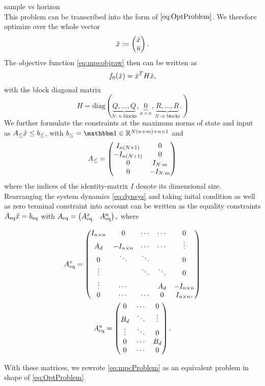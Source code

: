 \todo sample vs horizon\\

This problem can be transcribed into the form of $ \eqref{eq:OptProblem} $. We therefore optimize over the whole vector \[ \tilde{x} := \begin{pmatrix} {\bar{x}} \\ {\bar{u}} \end{pmatrix}. \] The objective function \eqref{eq:mpcobjraw} then can  be written as
\[ f_0(\tilde{x}) = \tilde{x} ^T  H \tilde{x}, \] with  the block diagonal matrix \[ H = \mathrm{diag}(\underbrace{Q,\dots,Q}_{N\cdot n \text{ blocks}},\underbrace{0}_{n \times n},\underbrace{R,\dots,R}_{N \cdot n \text{ blocks}}.) \]
We further formulate the constraints at the maximum norms of state and input as $ {A}_{\mathrm{\leq}} \tilde{x} \leq {b}_{\mathrm{\leq}} $, with $ \bineq = \ones \in \R^{N(n+m)+n \times 1} $ and
\[ {A}_{\mathrm{\leq}} = \begin{pmatrix}
I_{n(N+1)} & 0\\
-I_{n(N+1)} & 0\\
0 & I_{N\cdot m}\\
0 & -I_{N\cdot m}
\end{pmatrix}\]
where the indices of the identity-matrix $ I $ denote its dimensional size.
Rearranging the system dynamics \eqref{eq:dynsys} and taking inital condition as well as zero terminal constraint into account can be written as the equality constraints $ {A}_{\mathrm{eq}} \tilde{x} = {b}_{\mathrm{eq}} $ with
$ {A}_{\mathrm{eq}} =   \left( {A}_{\mathrm{eq}}^x \quad {A}_{\mathrm{eq}}^u \right), $ where

\begin{gather*}
	{A}_{\mathrm{eq}}^x =  \begin{pmatrix}
	I_{n\times n} & 0 & \cdots & \cdots & 0\\
	A_d & -I_{n\times n} & \cdots & \cdots & \vdots\\
	0 & \ddots & \ddots &  &  0\\
	\vdots & & \ddots  & \ddots & 0\\
	\vdots & \cdots & & A_d & -I_{n\times n}\\
	0 &\cdots& \cdots & 0& I_{n\times n},
	\end{pmatrix}\\
	{A}_{\mathrm{eq}}^u = \begin{pmatrix}
	0 & \cdots & 0\\
	B_d &\ddots &\vdots\\
	\vdots &\ddots & 0\\
	0 & \cdots & B_d\\
	0 & \cdots & 0
	\end{pmatrix}.
\end{gather*}

With these matrices, we rewrote \eqref{eq:mpcProblem} as an equivalent problem in shape of  \eqref{eq:OptProblem}.